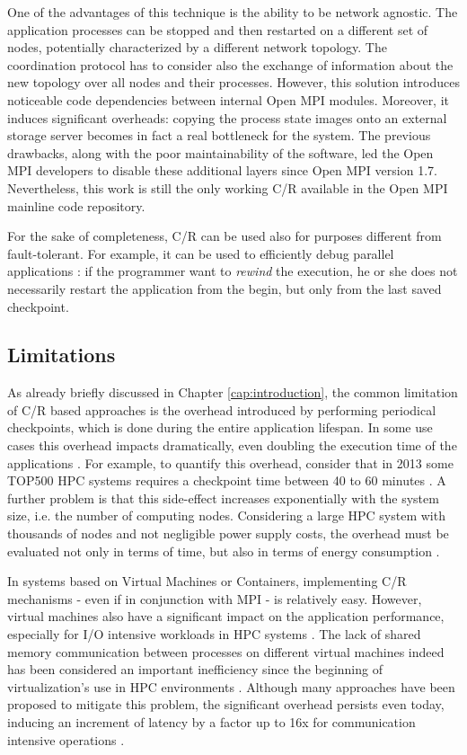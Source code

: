 One of the advantages of this technique is the ability to be network
agnostic. The application processes can be stopped
and then restarted on a different set of nodes, potentially
characterized by a different network topology. The coordination protocol has
to consider also the exchange of information about the new topology over all
nodes and their processes. However, this solution introduces noticeable code dependencies between internal
Open MPI modules. Moreover, it induces significant overheads: copying the
process state images onto an external storage server becomes in fact a real
bottleneck for the system. The previous drawbacks, along with the poor maintainability of the software,
led the Open MPI developers to disable these additional layers since Open MPI
version 1.7. Nevertheless, this work is still the only working C/R available in
the Open MPI mainline code repository.

For the sake of completeness, C/R can be used also for purposes different from
fault-tolerant. For example, it can be used to efficiently debug
parallel applications \cite{hursey2010checkpoint}: if the programmer want to
\emph{rewind} the execution,
he or she does not necessarily restart the application from the begin, but only
from the last saved checkpoint.


\subsection{Limitations}
As already briefly discussed in Chapter \ref{cap:introduction}, the common
limitation of C/R based approaches is the overhead introduced by performing
periodical checkpoints, which is done during the entire application
lifespan. In some use cases this overhead impacts dramatically, even doubling
the execution time of the applications \cite{philp2005software}. For example,
to quantify this overhead, consider that in 2013 some TOP500 HPC systems
requires a checkpoint time between 40 to 60 minutes
\cite{egwutuoha2013survey}. A further problem is that this side-effect
increases exponentially with the system size, i.e. the number of computing
nodes. Considering a large HPC system with thousands of nodes and not
negligible power supply costs, the overhead must be evaluated not only in
terms of time, but also in terms of energy consumption
\cite{mills2013evaluating}.

In systems based on Virtual Machines or Containers, implementing C/R
mechanisms - even if
in conjunction with MPI - is relatively easy. However, virtual machines
also have a significant impact on the application performance, especially for 
I/O intensive workloads in HPC systems \cite{xavier2013performance}. The lack
of shared memory communication between processes on different virtual machines
indeed has been considered an important inefficiency since the
beginning of virtualization's use in HPC environments \cite{huang2007virtual}.
Although many approaches have been proposed to mitigate
this problem, the significant overhead persists even today,
inducing an increment of latency by a factor up to 16x for
communication intensive operations \cite{pickartz2016impacts}.

